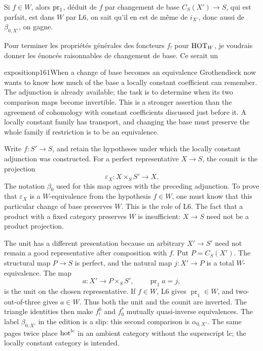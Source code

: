 Si $f \in W$, alors $\mathrm{pr}_1$, déduit de $f$ par changement de base $C_S(X') \longrightarrow S$, qui est parfait, est dans $W$ par L6, on sait qu'il en est de même de $i_{X'}$, donc aussi de $\beta_{0,X'}$, on gagne.

Pour terminer les propriétés générales des foncteurs $f_!$ pour $\mathrm{HOT}_W$, je voudrais donner les énoncés raisonnables de changement de base. Ce serait un

\begin{dcomment}{exposition}{p161}{When a change of base becomes an equivalence}
Grothendieck now wants to know how much of the base a locally constant coefficient can remember. The adjunction is already available; the task is to determine when its two comparison maps become invertible. This is a stronger assertion than the agreement of cohomology with constant coefficients discussed just before it. A locally constant family has transport, and changing the base must preserve the whole family if restriction is to be an equivalence.

Write $f:S'\to S$, and retain the hypotheses under which the locally constant adjunction was constructed. For a perfect representative $X\to S$, the counit is the projection
\[
 \varepsilon_X:X\times_S S'\longrightarrow X.
\]
The notation $\beta_0$ used for this map agrees with the preceding adjunction. To prove that $\varepsilon_X$ is a $W$-equivalence from the hypothesis $f\in W$, one must know that this particular change of base preserves $W$. This is the role of L6. The fact that a product with a fixed category preserves $W$ is insufficient: $X\to S$ need not be a product projection.

The unit has a different presentation because an arbitrary $X'\to S'$ need not remain a good representative after composition with $f$. Put $P=C_S(X')$. The structural map $P\to S$ is perfect, and the natural map $j:X'\to P$ is a total $W$-equivalence. The map
\[
 a:X'\longrightarrow P\times_S S',\qquad
 \operatorname{pr}_1a=j,
\]
is the unit on the chosen representative. If $f\in W$, L6 gives $\operatorname{pr}_1\in W$, and two-out-of-three gives $a\in W$. Thus both the unit and the counit are inverted. The triangle identities then make $f_!^0$ and $f_0^*$ mutually quasi-inverse equivalences. The label $\beta_{0,X'}$ in the edition is a slip: this second comparison is $\alpha_{0,X'}$. The same pages twice place $\mathrm{hot}^{\mathrm{lc}}$ in an ambient category without the superscript $\mathrm{lc}$; the locally constant category is intended.


\end{dcomment}
